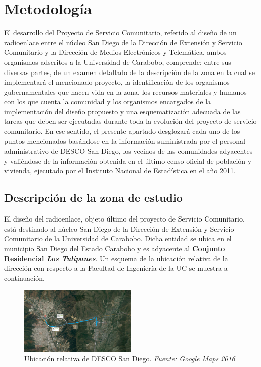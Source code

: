 \documentclass[11pt, a4paper, twosides]{report}
\begin{document}
\chapter{Metodología}
El desarrollo del Proyecto de Servicio Comunitario, referido al diseño de un radioenlace entre el núcleo San Diego de la Dirección de Extensión y Servicio Comunitario y la Dirección de Medios Electrónicos y Telemática, ambos organismos adscritos a la Universidad de Carabobo, comprende; entre sus diversas partes, de un examen detallado de la descripción de la zona en la cual se implementará el mencionado proyecto, la identificación de los organismos gubernamentales que hacen vida en la zona, los recursos materiales y humanos con los que cuenta la comunidad y los organismos encargados de la implementación del diseño propuesto y una esquematización adecuada de las tareas que deben ser ejecutadas durante toda la evolución del proyecto de servicio comunitario. En ese sentido, el presente apartado desglozará cada uno de los puntos mencionados basándose en la información suministrada por el personal administrativo de DESCO San Diego, los vecinos de las comunidades adyacentes y valiéndose de la información  obtenida en el último censo oficial de población y vivienda, ejecutado por el Instituto Nacional de Estadística en el año 2011.

\section{Descripción de la zona de estudio}
El diseño del radioenlace, objeto último del proyecto de Servicio Comunitario, está destinado al núcleo San Diego de la Dirección de Extensión y Servicio Comunitario de la Universidad de Carabobo. Dicha entidad se ubica en el municipio San Diego del Estado Carabobo y es adyacente al \textbf{Conjunto Residencial \textit{Los Tulipanes}}. Un esquema de la ubicación relativa de la dirección con respecto a la Facultad de Ingeniería de la UC se muestra a continuación.

\begin{figure}[h]
	\centering
	\includegraphics[width=0.5\textwidth]{fig1}
	\caption{Ubicación relativa de DESCO San Diego. \textit{Fuente: Google Maps 2016}}
\end{figure}
\end{document}

